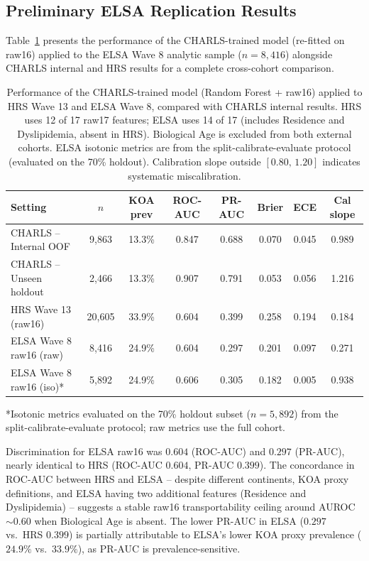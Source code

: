 \documentclass[11pt,a4paper]{article}
\begin{document}
\subsection{Preliminary ELSA Replication Results}

Table~\ref{tab:full-comparison} presents the performance of the CHARLS-trained model (re-fitted on
raw16) applied to the ELSA Wave 8 analytic sample ($n=8{,}416$) alongside CHARLS internal and HRS
results for a complete cross-cohort comparison.

\begin{table}[h!]
\centering
\small
\caption{Performance of the CHARLS-trained model (Random Forest + raw16) applied to HRS Wave 13
and ELSA Wave 8, compared with CHARLS internal results. HRS uses 12 of 17 raw17 features; ELSA
uses 14 of 17 (includes Residence and Dyslipidemia, absent in HRS). Biological Age is excluded
from both external cohorts. ELSA isotonic metrics are from the split-calibrate-evaluate protocol
(evaluated on the 70\% holdout). Calibration slope outside $[0.80,\,1.20]$ indicates systematic
miscalibration.}
\label{tab:full-comparison}
\begin{tabular}{lccccccc}
\toprule
Setting & $n$ & KOA prev & ROC-AUC & PR-AUC & Brier & ECE & Cal slope \\
\midrule
CHARLS -- Internal OOF  & 9{,}863  & 13.3\% & 0.847 & 0.688 & 0.070 & 0.045 & 0.989 \\
CHARLS -- Unseen holdout & 2{,}466  & 13.3\% & 0.907 & 0.791 & 0.053 & 0.056 & 1.216 \\
\midrule
HRS Wave 13 (raw16) & 20{,}605 & 33.9\% & 0.604 & 0.399 & 0.258 & 0.194 & 0.184 \\
\midrule
ELSA Wave 8 raw16 (raw) & 8{,}416  & 24.9\% & 0.604 & 0.297 & 0.201 & 0.097 & 0.271 \\
ELSA Wave 8 raw16 (iso)* & 5{,}892  & 24.9\% & 0.606 & 0.305 & 0.182 & 0.005 & 0.938 \\
\bottomrule
\end{tabular}

\vspace{4pt}
\footnotesize{*Isotonic metrics evaluated on the 70\% holdout subset ($n=5{,}892$) from the
split-calibrate-evaluate protocol; raw metrics use the full cohort.}
\end{table}

Discrimination for ELSA raw16 was $0.604$ (ROC-AUC) and $0.297$ (PR-AUC), nearly identical to
HRS (ROC-AUC $0.604$, PR-AUC $0.399$). The concordance in ROC-AUC between HRS and ELSA --
despite different continents, KOA proxy definitions, and ELSA having two additional features
(Residence and Dyslipidemia) -- suggests a stable raw16 transportability ceiling around AUROC
${\sim}0.60$ when Biological Age is absent. The lower PR-AUC in ELSA ($0.297$ vs.\ HRS $0.399$)
is partially attributable to ELSA's lower KOA proxy prevalence ($24.9\%$ vs.\ $33.9\%$), as
PR-AUC is prevalence-sensitive.
\end{document}
